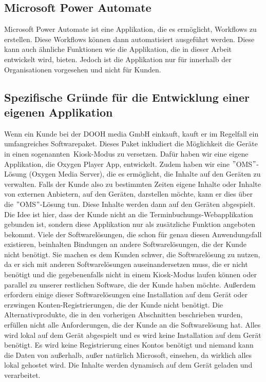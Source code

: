\subsection{Microsoft Power Automate}\label{subsec:microsoft-power-automate}
Microsoft Power Automate ist eine Applikation, die es ermöglicht, Workflows zu erstellen.
Diese Workflows können dann automatisiert ausgeführt werden.
Diese kann auch ähnliche Funktionen wie die Applikation, die in dieser Arbeit entwickelt wird, bieten.
Jedoch ist die Applikation nur für innerhalb der Organisationen vorgesehen und nicht für Kunden.
\subsection{Spezifische Gründe für die Entwicklung einer eigenen Applikation}\label{subsec:spezifische-grunde-fur-die-entwicklung-einer-eigenen-applikation}
Wenn ein Kunde bei der DOOH media GmbH einkauft, kauft er im Regelfall ein umfangreiches Softwarepaket.
Dieses Paket inkludiert die Möglichkeit die Geräte in einen sogenannten~\gls{Kiosk-Modus} zu versetzen.
Dafür haben wir eine eigene Applikation, die Oxygen Player App, entwickelt.
Zudem haben wir eine \("\)OMS\("\)-Lösung (Oxygen Media Server), die es ermöglicht, die Inhalte auf den Geräten zu verwalten.
Falls der Kunde also zu bestimmten Zeiten eigene Inhalte oder Inhalte von externen Anbietern, auf den Geräten, darstellen möchte, kann er dies über die \("\)OMS\("\)-Lösung tun.
Diese Inhalte werden dann auf den Geräten abgespielt.
\newline
Die Idee ist hier, dass der Kunde nicht an die Terminbuchungs-Webapplikation gebunden ist, sondern diese Applikation nur als zusätzliche Funktion angeboten bekommt.
Viele der Softwarelösungen, die schon für genau diesen Anwendungsfall existieren, beinhalten Bindungen an andere Softwarelösungen, die der Kunde nicht benötigt.
Sie machen es dem Kunden schwer, die Softwarelösung zu nutzen, da er sich mit anderen Softwarelösungen auseinandersetzen muss, die er nicht benötigt und die gegebenenfalls nicht in einem Kiosk-Modus laufen können oder parallel zu unserer restlichen Software, die der Kunde haben möchte.
Außerdem erfordern einige dieser Softwarelösungen eine Installation auf dem Gerät oder erzwingen Konten-Registrierungen, die der Kunde nicht benötigt.
\newline
Die Alternativprodukte, die in den vorherigen Abschnitten beschrieben wurden, erfüllen nicht alle Anforderungen, die der Kunde an die Softwarelösung hat.
Alles wird lokal auf dem Gerät abgespielt und es wird keine Installation auf dem Gerät benötigt.
Es wird keine Registrierung eines Kontos benötigt und niemand kann die Daten von außerhalb, außer natürlich Microsoft, einsehen, da wirklich alles lokal gehostet wird.
Die Inhalte werden dynamisch auf dem Gerät geladen und verarbeitet.
